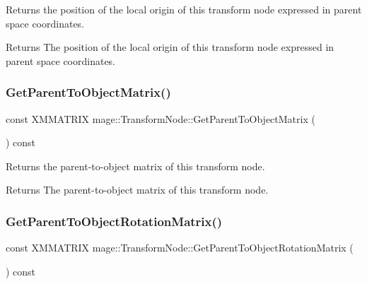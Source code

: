 Returns the position of the local origin of this transform node expressed in parent space coordinates.

\begin{DoxyReturn}{Returns}
The position of the local origin of this transform node expressed in parent space coordinates. 
\end{DoxyReturn}
\hypertarget{structmage_1_1_transform_node_a13efbdabf75f4a26fa8512443d0064f0}{}\label{structmage_1_1_transform_node_a13efbdabf75f4a26fa8512443d0064f0} 
\subsubsection{\texorpdfstring{Get\+Parent\+To\+Object\+Matrix()}{GetParentToObjectMatrix()}}
{\footnotesize\ttfamily const X\+M\+M\+A\+T\+R\+IX mage\+::\+Transform\+Node\+::\+Get\+Parent\+To\+Object\+Matrix (\begin{DoxyParamCaption}{ }\end{DoxyParamCaption}) const\hspace{0.3cm}{\ttfamily [noexcept]}}

Returns the parent-\/to-\/object matrix of this transform node.

\begin{DoxyReturn}{Returns}
The parent-\/to-\/object matrix of this transform node. 
\end{DoxyReturn}
\hypertarget{structmage_1_1_transform_node_a6a5c82910f5f6395a74bddf3d564547c}{}\label{structmage_1_1_transform_node_a6a5c82910f5f6395a74bddf3d564547c} 
\subsubsection{\texorpdfstring{Get\+Parent\+To\+Object\+Rotation\+Matrix()}{GetParentToObjectRotationMatrix()}}
{\footnotesize\ttfamily const X\+M\+M\+A\+T\+R\+IX mage\+::\+Transform\+Node\+::\+Get\+Parent\+To\+Object\+Rotation\+Matrix (\begin{DoxyParamCaption}{ }\end{DoxyParamCaption}) const\hspace{0.3cm}{\ttfamily [noexcept]}}

